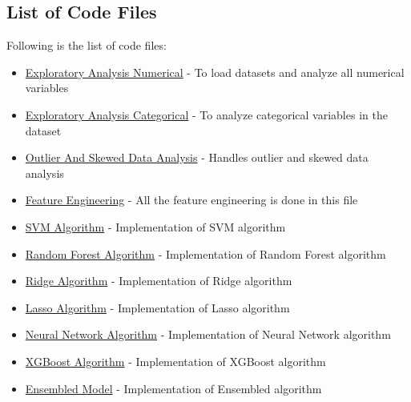 \documentclass[sigconf]{acmart}
\begin{document}
	\subsection{List of Code Files}    
	Following is the list of code files:
	\begin{itemize}
		\item \href{https://github.com/bigdata-i523/hid306/blob/master/project/code/1.1_exploratory_analysis_numerical.ipynb}{Exploratory Analysis Numerical} - To load datasets and analyze all numerical variables
		
		\item \href{https://github.com/bigdata-i523/hid306/blob/master/project/code/1.2_exploratory_analysis_categorical.ipynb}{Exploratory Analysis Categorical} - To analyze categorical variables in the dataset
		
		\item \href{https://github.com/bigdata-i523/hid306/blob/master/project/code/1.3_outlier_and_skewed_data_analysis.ipynb}{Outlier And Skewed Data Analysis} - Handles outlier and skewed data analysis
		
		\item \href{https://github.com/bigdata-i523/hid306/blob/master/project/code/1.4_feature_engineering.ipynb}{Feature Engineering} - All the feature engineering is done in this file
		
		\item \href{https://github.com/bigdata-i523/hid306/blob/master/project/code/2.1_algorithm_svm.ipynb}{SVM Algorithm} - Implementation of SVM algorithm
		
		\item \href{https://github.com/bigdata-i523/hid306/blob/master/project/code/2.2_algorithm_random_forest.ipynb}{Random Forest Algorithm} - Implementation of Random Forest algorithm
		
		\item \href{https://github.com/bigdata-i523/hid306/blob/master/project/code/2.3_algorithm_ridge.ipynb}{Ridge Algorithm} - Implementation of Ridge algorithm
		
		\item \href{https://github.com/bigdata-i523/hid306/blob/master/project/code/2.4_algorithm_lasso.ipynb}{Lasso Algorithm} - Implementation of Lasso algorithm
		
		\item \href{https://github.com/bigdata-i523/hid306/blob/master/project/code/2.5_algorithm_neural_network_tf.ipynb}{Neural Network Algorithm} - Implementation of Neural Network algorithm
		
		\item \href{https://github.com/bigdata-i523/hid306/blob/master/project/code/2.6_algorithm_xgboost.ipynb}{XGBoost Algorithm} - Implementation of XGBoost algorithm
		
		\item \href{https://github.com/bigdata-i523/hid306/blob/master/project/code/3_ensemble_kaggle_submission.ipynb}{Ensembled Model} - Implementation of Ensembled algorithm
	\end{itemize}    
	
\end{document}
